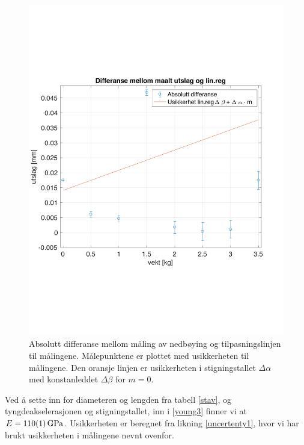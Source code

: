 \documentclass[%
 reprint,
 amsmath,amssymb,
 aps,
 norsk,
 booktabs
]{revtex4-1}
\begin{document}
\begin{figure}[h!]
  \centering
  \includegraphics[scale=0.40]{usikkerhet_c.pdf}
  \caption{Absolutt differanse mellom måling av nedbøying og tilpasningslinjen til målingene. Målepunktene er plottet med usikkerheten til målingene. Den oransje linjen er usikkerheten i stigningstallet $\Delta \alpha$ med konstanleddet $\Delta \beta$ for $m=0$.}
  \label{data_usikker}
\end{figure}
Ved å sette inn for diameteren og lengden fra tabell \vref{stav}, og tyngdeakselerasjonen og stigningstallet, inn i \eqref{young3} finner vi at $E=\SI{110\pm1}{\giga\pascal}$. Usikkerheten er beregnet fra likning \eqref{uncertenty1}, hvor vi har brukt usikkerheten i målingene nevnt ovenfor.
\end{document}

